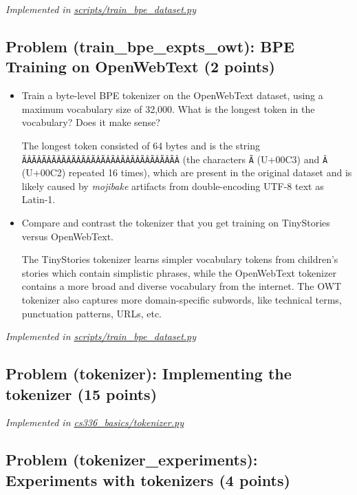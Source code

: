 \documentclass[letterpaper]{article}
\begin{document}
\textit{Implemented in  \href{https://github.com/echung32/ece405-assignment1-basics/blob/main/scripts/train_bpe_dataset.py}{scripts/train\_bpe\_dataset.py}}

\subsection{Problem (train\_bpe\_expts\_owt): BPE Training on OpenWebText (2 points)}

\begin{itemize}
	\item[(a)] Train a byte-level BPE tokenizer on the OpenWebText dataset, using a maximum vocabulary
	size of 32,000. What is the longest token in the vocabulary? Does it make sense?

	The longest token consisted of 64 bytes and is the string \texttt{ÃÂÃÂÃÂÃÂÃÂÃÂÃÂÃÂÃÂÃÂÃÂÃÂ\allowbreak ÃÂÃÂÃÂÃÂ} (the characters \texttt{Ã} (U+00C3) and \texttt{Â} (U+00C2) repeated 16 times), which are present in the original dataset and is likely caused by \textit{mojibake} artifacts from double-encoding UTF-8 text as Latin-1.

	\item[(b)] Compare and contrast the tokenizer that you get training on TinyStories versus OpenWebText.

	The TinyStories tokenizer learns simpler vocabulary tokens from children's stories which contain simplistic phrases, while the OpenWebText tokenizer contains a more broad and diverse vocabulary from the internet. The OWT tokenizer also captures more domain-specific subwords, like technical terms, punctuation patterns, URLs, etc.

\end{itemize}

\textit{Implemented in  \href{https://github.com/echung32/ece405-assignment1-basics/blob/main/scripts/train_bpe_dataset.py}{scripts/train\_bpe\_dataset.py}}

\subsection{Problem (tokenizer): Implementing the tokenizer (15 points)}

\textit{Implemented in \href{https://github.com/echung32/ece405-assignment1-basics/blob/main/cs336_basics/tokenizer.py}{cs336\_basics/tokenizer.py}}

\subsection{Problem (tokenizer\_experiments): Experiments with tokenizers (4 points)}
\end{document}

